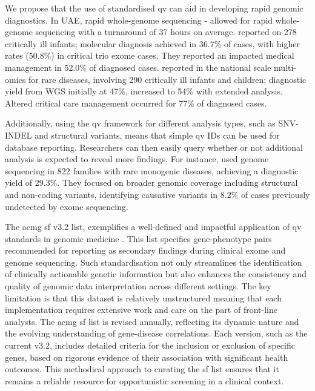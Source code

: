We propose that the use of standardised \ac{qv} can aid in developing rapid genomic diagnostics. 
In UAE, rapid whole-genome sequencing - \citep{abou2023rapid}
allowed for rapid whole-genome sequencing with a turnaround of 37 hours on average.
\citet{meng2017use} reported on 278 critically ill infants; molecular diagnosis achieved in 36.7\% of cases, with higher rates (50.8\%) in critical trio exome cases. They reported an impacted medical management in 52.0\% of diagnosed cases.
\citet{lunke2023integrated} reported in the national scale multi-omics for rare diseases, involving 290 critically ill infants and children; diagnostic yield from WGS initially at 47\%, increased to 54\% with extended analysis.
Altered critical care  management occurred for 77\% of diagnosed cases.

Additionally, using the \ac{qv} framework for different analysis types, such as SNV-INDEL and structural variants, means that simple \ac{qv} IDs can be used for database reporting. 
Researchers can then easily query whether or not additional analysis is expected to reveal more findings. 
For instance,
\citet{wojcik2024genome} used genome sequencing in 822 families with rare monogenic diseases, achieving a diagnostic yield of 29.3\%.
They focused on broader genomic coverage including structural and non-coding variants, identifying causative variants in 8.2\% of cases previously undetected by exome sequencing.

The \ac{acmg} \ac{sf} v3.2 list, exemplifies a well-defined and impactful application of \ac{qv} standards in genomic medicine 
\cite{miller2023acmg}. 
This list specifies gene-phenotype pairs recommended for reporting as secondary findings during clinical exome and genome sequencing. 
Such standardisation not only streamlines the identification of clinically actionable genetic information but also enhances the consistency and quality of genomic data interpretation across different settings.
The key limitation is that this dataset is relatively unstructured meaning that each implementation requires extensive work and care on the part of front-line analysts. 
The \ac{acmg} \ac{sf} list is revised annually, reflecting its dynamic nature and the evolving understanding of gene-disease correlations. 
Each version, such as the current v3.2, includes detailed criteria for the inclusion or exclusion of specific genes, based on rigorous evidence of their association with significant health outcomes. 
This methodical approach to curating the \ac{sf}  list ensures that it remains a reliable resource for opportunistic screening in a clinical context.

